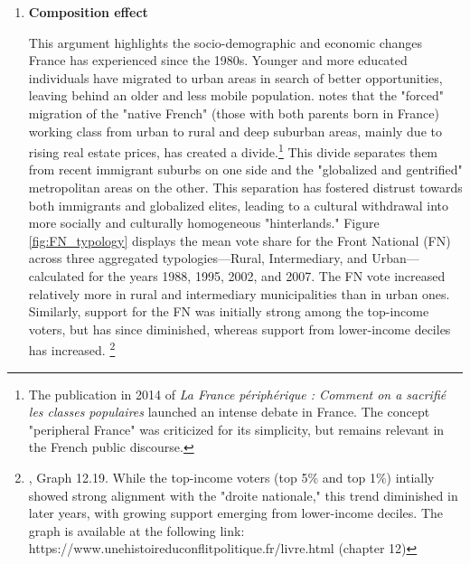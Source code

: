 \begin{enumerate}
    \item \textbf{Composition effect}

This argument highlights the socio-demographic and economic changes France has experienced since the 1980s. Younger and more educated individuals have migrated to urban areas in search of better opportunities, leaving behind an older and less mobile population. \cite{Guilly2014} notes that the "forced" migration of the "native French" (those with both parents born in France) working class from urban to rural and deep suburban areas, mainly due to rising real estate prices, has created a divide.\footnote{The publication in 2014 of \textit{La France périphérique : Comment on a sacrifié les classes populaires} launched an intense debate in France. The concept "peripheral France" was criticized for its simplicity, but remains relevant in the French public discourse.} This divide separates them from recent immigrant suburbs on one side and the "globalized and gentrified" metropolitan areas on the other. This separation has fostered distrust towards both immigrants and globalized elites, leading to a cultural withdrawal into more socially and culturally homogeneous "hinterlands." Figure \ref{fig:FN_typology} displays the mean vote share for the Front National (FN) across three aggregated typologies—Rural, Intermediary, and Urban—calculated for the years 1988, 1995, 2002, and 2007. The FN vote increased relatively more in rural and intermediary municipalities than in urban ones. Similarly, support for the FN was initially strong among the top-income voters, but has since diminished, whereas support from lower-income deciles has increased. \footnote{\cite{Piketty}, Graph 12.19. While the top-income voters (top 5\% and top 1\%) intially showed strong alignment with the "droite nationale," this trend diminished in later years, with growing support emerging from lower-income deciles. The graph is available at the following link: https://www.unehistoireduconflitpolitique.fr/livre.html (chapter 12)}





\end{enumerate}
